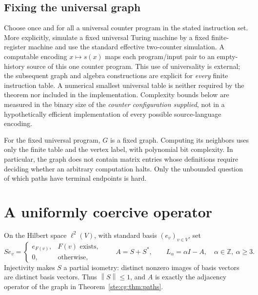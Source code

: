 \documentclass[11pt,letterpaper]{article}
\theoremstyle{definition}
\theoremstyle{remark}
\newcommand{\Z}{\mathbb Z}
\newcommand{\norm}[1]{\left\lVert #1\right\rVert}
\begin{document}
\subsection{Fixing the universal graph}
Choose once and for all a universal counter program in the stated
instruction set. More explicitly, simulate a fixed universal Turing
machine by a fixed finite-register machine and use the standard effective
two-counter simulation. A computable encoding $x\mapsto s(x)$ maps each
program/input pair to an empty-history source of this one counter program.
This use of universality is external; the subsequent graph and algebra
constructions are explicit for \emph{every} finite instruction table.
A numerical smallest universal table is neither required by the theorem
nor included in the implementation. Complexity bounds below are measured
in the binary size of the \emph{counter configuration supplied}, not in a
hypothetically efficient implementation of every possible source-language
encoding.

For the fixed universal program, $G$ is a fixed graph. Computing its
neighbors uses only the finite table and the vertex label, with polynomial
bit complexity. In particular, the graph does not contain matrix entries
whose definitions require deciding whether an arbitrary computation halts.
Only the unbounded question of which paths have terminal endpoints is hard.

\section{A uniformly coercive operator}\label{ste:cg:sec:operator}
On the Hilbert space $\ell^2(V)$, with standard basis $(e_v)_{v\in V}$, set
\begin{equation}\label{ste:cg:eq:operators}
 Se_v=\begin{cases}e_{F(v)},&F(v)\text{ exists},\\0,&\text{otherwise},\end{cases}
 \qquad A=S+S^*,\qquad L_\alpha=\alpha I-A,
 \quad\alpha\in\Z,\ \alpha\ge3.
\end{equation}
Injectivity makes $S$ a partial isometry: distinct nonzero images of basis
vectors are distinct basis vectors. Thus $\norm S\le1$, and $A$ is exactly
the adjacency operator of the graph in Theorem~\ref{ste:cg:thm:paths}.
\end{document}
